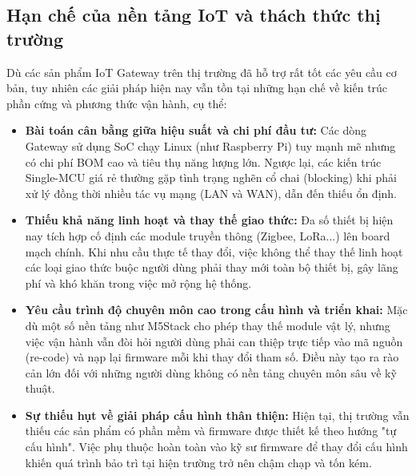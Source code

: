     \subsection{Hạn chế của nền tảng IoT và thách thức thị trường}\label{sec:han_che_iot}
        Dù các sản phẩm IoT Gateway trên thị trường đã hỗ trợ rất tốt các yêu cầu cơ bản, tuy nhiên các giải pháp hiện nay vẫn tồn tại những hạn chế về kiến trúc phần cứng và phương thức vận hành, cụ thể:
        \begin{itemize}
            \item \textbf{Bài toán cân bằng giữa hiệu suất và chi phí đầu tư:} Các dòng Gateway sử dụng SoC chạy Linux (như Raspberry Pi) tuy mạnh mẽ nhưng có chi phí BOM cao và tiêu thụ năng lượng lớn. Ngược lại, các kiến trúc Single-MCU giá rẻ thường gặp tình trạng nghẽn cổ chai (blocking) khi phải xử lý đồng thời nhiều tác vụ mạng (LAN và WAN), dẫn đến thiếu ổn định.
            \item \textbf{Thiếu khả năng linh hoạt và thay thế giao thức:} Đa số thiết bị hiện nay tích hợp cố định các module truyền thông (Zigbee, LoRa...) lên board mạch chính. Khi nhu cầu thực tế thay đổi, việc không thể thay thế linh hoạt các loại giao thức buộc người dùng phải thay mới toàn bộ thiết bị, gây lãng phí và khó khăn trong việc mở rộng hệ thống.
            \item \textbf{Yêu cầu trình độ chuyên môn cao trong cấu hình và triển khai:} Mặc dù một số nền tảng như M5Stack cho phép thay thế module vật lý, nhưng việc vận hành vẫn đòi hỏi người dùng phải can thiệp trực tiếp vào mã nguồn (re-code) và nạp lại firmware mỗi khi thay đổi tham số. Điều này tạo ra rào cản lớn đối với những người dùng không có nền tảng chuyên môn sâu về kỹ thuật.
            \item \textbf{Sự thiếu hụt về giải pháp cấu hình thân thiện:} Hiện tại, thị trường vẫn thiếu các sản phẩm có phần mềm và firmware được thiết kế theo hướng "tự cấu hình". Việc phụ thuộc hoàn toàn vào kỹ sư firmware để thay đổi cấu hình khiến quá trình bảo trì tại hiện trường trở nên chậm chạp và tốn kém.
        \end{itemize}

